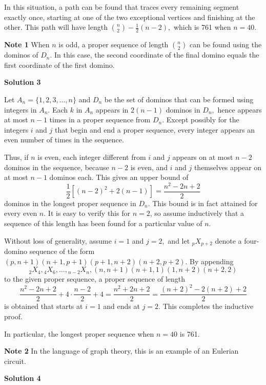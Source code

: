\begin{enumerate}
 
In this situation, a path can be found that traces every remaining segment exactly once, starting at one of the two exceptional vertices and finishing at the other. This path will have length $\binom{n}{2}-\frac{1}{2}(n-2),$ which is 761 when $n=40$.

 \textbf{Note 1} When $n$ is odd, a proper sequence of length $\binom{n}{2}$ can be found using the dominos of $D_{n}$. In this case, the second coordinate of the final domino equals the first coordinate of the first domino. 

 



\textbf{Solution 3}

Let $A_{n}=\{1,2,3, \ldots, n\}$ and $D_{n}$ be the set of dominos that can be formed using integers in $A_{n} .$ Each $k$ in $A_{n}$ appears in $2(n-1)$ dominos in $D_{n},$ hence appears at most $n-1$ times in a proper sequence from $D_{n}.$ Except possibly for the integers $i$ and $j$ that begin and end a proper sequence, every integer appears an even number of times in the sequence. 

 
Thus, if $n$ is even, each integer different from $i$ and $j$ appears on at most $n-2$ dominos in the sequence, because $n-2$ is even, and $i$ and $j$ themselves appear on at most $n-1$ dominos each. This gives an upper bound of
 \[\frac{1}{2}\left[(n-2)^{2}+2(n-1)\right]=\frac{n^{2}-2 n+2}{2}\]dominos in the longest proper sequence in $D_{n}.$ This bound is in fact attained for every even $n.$ It is easy to verify this for $n=2$, so assume inductively that a sequence of this length has been found for a particular value of $n$. 

 
Without loss of generality, assume $i=1$ and $j=2,$ and let $_{p} X_{p+2}$ denote a four-domino sequence of the form $(p, n+1)(n+1, p+1)(p+1, n+2)(n+2, p+2) .$ By appending
 \[{ }_{2} X_{4},{ }_{4} X_{6}, \ldots,{ }_{n-2} X_{n},(n, n+1)(n+1,1)(1, n+2)(n+2,2)\]to the given proper sequence, a proper sequence of length
 \[\frac{n^{2}-2 n+2}{2}+4 \cdot \frac{n-2}{2}+4=\frac{n^{2}+2 n+2}{2}=\frac{(n+2)^{2}-2(n+2)+2}{2}\]is obtained that starts at $i=1$ and ends at $j=2 .$ This completes the inductive proof. 

 
In particular, the longest proper sequence when $n=40$ is 761.

 \textbf{Note 2} In the language of graph theory, this is an example of an Eulerian circuit.

 



\textbf{Solution 4}


\end{enumerate}
